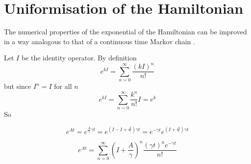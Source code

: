 \documentclass{article}
\begin{document}
\section{Uniformisation of the Hamiltonian}
The numerical properties of the exponential of the Hamiltonian can be improved in a way analogous to that of a continuous time Markov chain \cite{reibman1988numerical}. 

Let $I$ be the identity operator. By definition
\[
e^{kI} = \sum_{n=0}^\infty \frac{(kI)^n}{n!}
\]
but since $I^n=I$ for all $n$
\[
e^{kI} = \sum_{n=0}^\infty \frac{k^n}{n!}I = e^k
\]
So

\begin{equation*}
e^{At} = e^{\frac{A}{\gamma}\gamma t} = e^{\left(I - I + \frac{A}{\gamma}\right)\gamma t} = e^{-\gamma t}e^{\left( I + \frac{A}{\gamma}\right)\gamma t}
\end{equation*}

\begin{equation}
e^{At} = \sum_{n=0}^\infty  \left(I + \frac{A}{\gamma}\right) ^n\frac{(\gamma t)^n e^{-\gamma t}}{n!}
\label{uniformisation}
\end{equation}
\end{document}
